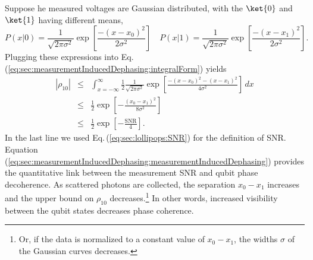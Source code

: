 Suppose he measured voltages are Gaussian distributed, with the $\ket{0}$ and $\ket{1}$ having different means, \begin{equation}
P(x|0) = \frac{1}{\sqrt{2\pi \sigma^2}}\exp \left[ \frac{-(x-x_0)^2}{2\sigma^2} \right] \quad P(x|1) = \frac{1}{\sqrt{2\pi \sigma^2}}\exp \left[ \frac{-(x-x_1)^2}{2\sigma^2} \right] . \end{equation}
Plugging these expressions into Eq.\,(\ref{eq:sec:measurementInducedDephasing:integralForm}) yields \begin{eqnarray}
\left| \rho_{10} \right| &\leq& \int_{x = -\infty}^{\infty} \frac{1}{2}\frac{1}{\sqrt{2\pi \sigma^2}} \exp \left[ \frac{-(x-x_0)^2 - (x-x_1)^2}{4 \sigma^2} \right] \, dx \nonumber \\
&\leq& \frac{1}{2} \exp \left[- \frac{(x_0 - x_1)^2}{8\sigma^2} \right] \\
&\leq& \frac{1}{2} \exp \left[- \frac{\text{SNR}}{4} \right] . \label{eq:sec:measurementInducedDephasing:measurementInducedDephasing} \end{eqnarray}
In the last line we used Eq.\,(\ref{eq:sec:lollipops:SNR}) for the definition of SNR.
Equation (\ref{eq:sec:measurementInducedDephasing:measurementInducedDephasing}) provides the quantitative link between the measurement SNR and qubit phase decoherence.
As scattered photons are collected, the separation $x_0 - x_1$ increases and the upper bound on $\rho_{10}$ decreases.\footnote{Or, if the data is normalized to a constant value of $x_0 - x_1$, the widths $\sigma$ of the Gaussian curves decreases.}
In other words, increased visibility between the qubit states decreases phase coherence.
